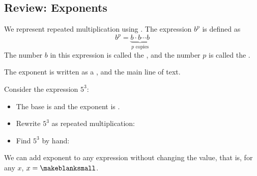 \subsection{Review: Exponents} 
\begin{definition}
We represent repeated multiplication using . The expression $b^p$ is defined as
\[
b^p=\underbrace{b\cdot b \cdots b}_{\mbox{$p$ copies}}
\]
The number $b$ in this expression is called the , and the number $p$ is called the .
\end{definition}
\begin{Note} The exponent is written as a \makeblank[1.5in], \makeblank[1.5in] and \makeblank[1.5in] the main line of text.\end{Note}
\begin{Example} Consider the expression $5^3$:
\begin{itemize}
\item The base is \makeblanksmall and the exponent is \makeblanksmall.
\item Rewrite $5^3$ as repeated multiplication: \makeblank
\item Find $5^3$ by hand: \makeblank
\end{itemize}
\end{Example}
\begin{Note}We can add exponent \makeblanksmall to any expression without changing the value, that is, for any $x$, $x=\makeblanksmall$.\end{Note}
